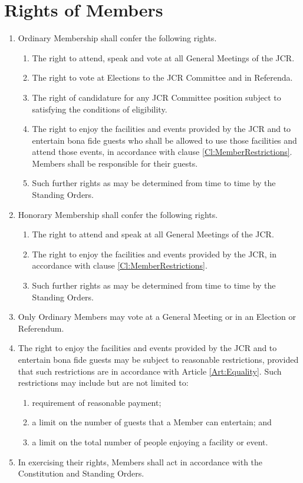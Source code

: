 \documentclass[11pt,a4paper, oneside]{memoir}
\begin{document}
	\section{Rights of Members}
	\begin{enumerate}
		\item Ordinary Membership shall confer the following rights.
		\begin{enumerate}
			\item The right to attend, speak and vote at all General Meetings of the JCR.
			\item The right to vote at Elections to the JCR Committee and in Referenda.
			\item The right of candidature for any JCR Committee position subject to satisfying the conditions of eligibility.
			\item The right to enjoy the facilities and events provided by the JCR and to entertain bona fide guests who shall be allowed to use those facilities and attend those events, in accordance with clause \ref{Cl:MemberRestrictions}.
			Members shall be responsible for their guests.
			\item Such further rights as may be determined from time to time by the Standing Orders.
		\end{enumerate}
		\item Honorary Membership shall confer the following rights.
		\begin{enumerate}
			\item The right to attend and speak at all General Meetings of the JCR.
			\item The right to enjoy the facilities and events provided by the JCR, in accordance with clause \ref{Cl:MemberRestrictions}.
			\item Such further rights as may be determined from time to time by the Standing Orders.
		\end{enumerate}
		\item Only Ordinary Members may vote at a General Meeting or in an Election or Referendum.
		\item \label{Cl:MemberRestrictions} The right to enjoy the facilities and events provided by the JCR and to entertain bona fide guests may be subject to reasonable restrictions, provided that such restrictions are in accordance with Article \ref{Art:Equality}.
		Such restrictions may include but are not limited to:
		\begin{enumerate}
			\item requirement of reasonable payment;
			\item a limit on the number of guests that a Member can entertain; and
			\item a limit on the total number of people enjoying a facility or event.
		\end{enumerate}
		\item In exercising their rights, Members shall act in accordance with the Constitution and Standing Orders.
	\end{enumerate}
\end{document}

